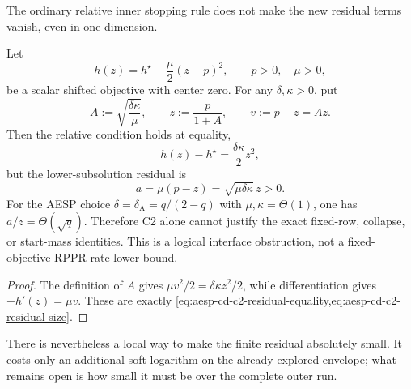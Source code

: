 The ordinary relative inner stopping rule does not make the new residual
terms vanish, even in one dimension.

\begin{proposition}
\label{prop:aesp-cd-c2-residual-stop}
Let
\begin{equation*}
 h(z)=h^\star+\frac{\mu}{2}(z-p)^2,
 \qquad p>0,\quad \mu>0,
\end{equation*}
be a scalar shifted objective with center zero.  For any $\delta,\kappa>0$,
put
\begin{equation*}
 A:=\sqrt{\frac{\delta\kappa}{\mu}},
 \qquad z:=\frac{p}{1+A},
 \qquad v:=p-z=Az.
\end{equation*}
Then the relative condition holds at equality,
\begin{equation}
 h(z)-h^\star=\frac{\delta\kappa}{2}z^2,
 \label{eq:aesp-cd-c2-residual-equality}
\end{equation}
but the lower-subsolution residual is
\begin{equation}
 a=\mu(p-z)=\sqrt{\mu\delta\kappa}\,z>0.
 \label{eq:aesp-cd-c2-residual-size}
\end{equation}
For the AESP choice $\delta=\delta_{\mathrm A}=q/(2-q)$ with
$\mu,\kappa=\Theta(1)$, one has $a/z=\Theta(\sqrt q)$.  Therefore C2 alone
cannot justify the exact fixed-row, collapse, or start-mass identities.  This
is a logical interface obstruction, not a fixed-objective RPPR rate lower
bound.
\end{proposition}

\begin{proof}
The definition of $A$ gives
$\mu v^2/2=\delta\kappa z^2/2$, while differentiation gives
$-h'(z)=\mu v$.  These are exactly
\cref{eq:aesp-cd-c2-residual-equality,eq:aesp-cd-c2-residual-size}.
\end{proof}

There is nevertheless a local way to make the finite residual absolutely
small.  It costs only an additional soft logarithm on the already explored
envelope; what remains open is how small it must be over the complete outer
run.

